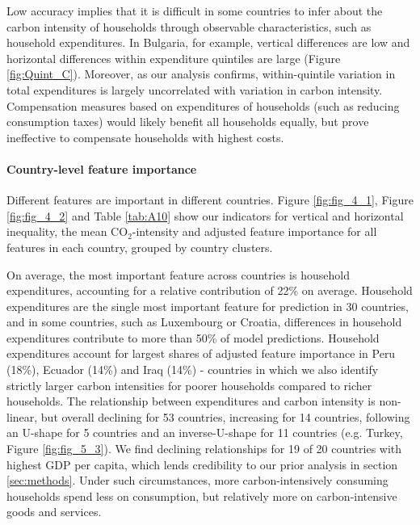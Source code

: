 \documentclass[12pt, a4paper]{article}
\begin{document}
Low accuracy implies that it is difficult in some countries to infer about the carbon intensity of households through observable characteristics, such as household expenditures. In Bulgaria, for example, vertical differences are low and horizontal differences within expenditure quintiles are large (Figure \ref{fig:Quint_C}). Moreover, as our analysis confirms, within-quintile variation in total expenditures is largely uncorrelated with variation in carbon intensity. Compensation measures based on expenditures of households (such as reducing consumption taxes) would likely benefit all households equally, but prove ineffective to compensate households with highest costs.

\paragraph{Country-level feature importance}

Different features are important in different countries. Figure \ref{fig:fig_4_1}, Figure \ref{fig:fig_4_2} and Table \ref{tab:A10} show our indicators for vertical and horizontal inequality, the mean CO$_{2}$-intensity and adjusted feature importance for all features in each country, grouped by country clusters. %

On average, the most important feature across countries is household expenditures, accounting for a relative contribution of 22\% on average. Household expenditures are the single most important feature for prediction in 30 countries, and in some countries, such as Luxembourg or Croatia, differences in household expenditures contribute to more than 50\% of model predictions. Household expenditures account for largest shares of adjusted feature importance in Peru (18\%), Ecuador (14\%) and Iraq (14\%) - countries in which we also identify strictly larger carbon intensities for poorer households compared to richer households. The relationship between expenditures and carbon intensity is non-linear, but overall declining for 53 countries, increasing for 14 countries, following an U-shape for 5 countries and an inverse-U-shape for 11 countries (e.g. Turkey, Figure \ref{fig:fig_5_3}). We find declining relationships for 19 of 20 countries with highest GDP per capita, which lends credibility to our prior analysis in section \ref{sec:methods}. Under such circumstances, more carbon-intensively consuming households spend less on consumption, but relatively more on carbon-intensive goods and services.
\end{document}
